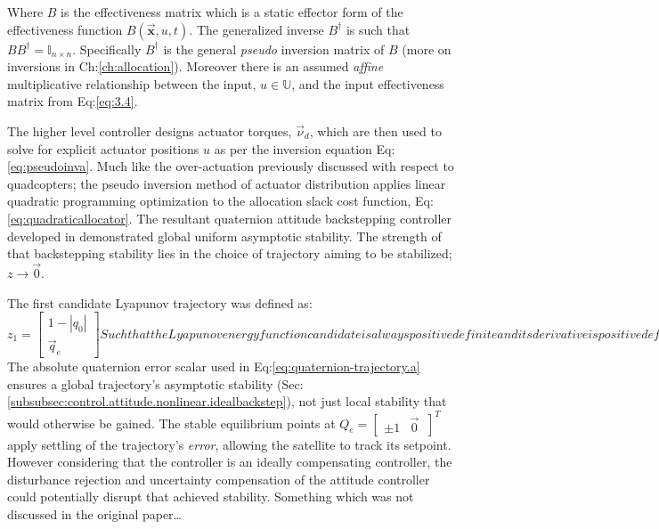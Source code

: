 Where $B$ is the effectiveness matrix which is a static effector form of the effectiveness function $B(\vec{\mathbf{x}},u,t)$. The generalized inverse $B^{\dagger}$ is such that $BB^{\dagger}=\mathbb{I}_{n\times n}$. Specifically $B^{\dagger}$ is the general \emph{pseudo} inversion matrix of $B$ (more on inversions in Ch:\ref{ch:allocation}). Moreover there is an assumed \emph{affine} multiplicative relationship between the input, $u\in\mathbb{U}$, and the input effectiveness matrix from Eq:\ref{eq:3.4}. 
\par
The higher level controller designs actuator torques, $\vec{\nu}_d$, which are then used to solve for explicit actuator positions $u$ as per the inversion equation Eq:\ref{eq:pseudoinva}. Much like the over-actuation previously discussed with respect to quadcopters; the pseudo inversion method of actuator distribution applies linear quadratic programming optimization to the allocation slack cost function, Eq:\ref{eq:quadraticallocator}. The resultant quaternion attitude backstepping controller developed in \cite{satellitebackstepping} demonstrated global uniform asymptotic stability. The strength of that backstepping stability lies in the choice of trajectory aiming to be stabilized; $z\rightarrow\vec{0}$. 
\par
The first candidate Lyapunov trajectory was defined as:
\begin{subequations}
\begin{equation}\label{eq:quaternion-trajectory.a}
z_1=\begin{bmatrix}
1-|q_0|\\
\vec{q}_e
\end{bmatrix}
\end{equation}
Such that the Lyapunov energy function candidate is always positive definite and its derivative is positive definite descrescent. The particulars of that stability proof are omitted but it is worth detailing their chosen candidate function;
\begin{equation}
V_1(z)=z_1\text{}^Tz_1>0~~~~\forall[q_0,\vec{q}_e]
\end{equation}
\end{subequations}
The absolute quaternion error scalar used in Eq:\ref{eq:quaternion-trajectory.a} ensures a global trajectory's asymptotic stability (Sec:\ref{subsubsec:control.attitude.nonlinear.idealbackstep}), not just local stability that would otherwise be gained. The stable equilibrium points at $Q_e=\begin{bmatrix}
\pm 1 & \vec{0}~
\end{bmatrix}^T$ apply settling of the trajectory's \emph{error}, allowing the satellite to track its setpoint. However considering that the controller is an ideally compensating controller, the disturbance rejection and uncertainty compensation of the attitude controller could potentially disrupt that achieved stability. Something which was not discussed in the original paper\ldots